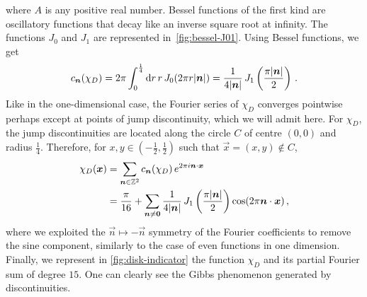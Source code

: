 \begin{example}
  where $A$ is any positive real number. Bessel functions of the first kind are
  oscillatory functions that decay like an inverse square root at infinity. The functions
  $J_0$ and $J_1$ are represented in~\cref{fig:bessel-J01}. Using Bessel functions, we get
  \begin{equation}
    c_{\bm{n}}(\chi_D)=2\pi\int_0^{\frac{1}{4}}\mathrm{d} r\,r\,J_0(2\pi r|\bm{n}|)
    =\frac{1}{4|\bm{n}|}\,J_1\left(\frac{\pi|\bm{n}|}{2}\right)\,.
  \end{equation}
  Like in the one-dimensional case, the Fourier series of $\chi_D$ converges pointwise
  perhaps except at points of jump discontinuity, which we will admit here. For $\chi_D$,
  the jump discontinuities are located along the circle $C$ of centre $(0,0)$ and radius
  $\frac14$. Therefore, for $x,y\in(-\frac12,\frac12)$ such that $\vec{x}=(x,y)\notin C$,
  \begin{align}
    \chi_D(\bm{x})&=\sum_{\bm{n}\in\mathbb{Z}^2}c_{\bm{n}}(\chi_D)\,
    e^{2\pi i\bm{n}\cdotp\bm{x}}\\
    &=\frac{\pi}{16}+\sum_{\bm{n}\neq\bm{0}}
    \frac{1}{4|\bm{n}|}\,J_1\left(\frac{\pi|\bm{n}|}{2}\right)
    \cos(2\pi\bm{n}\cdot\bm{x})\,,
  \end{align}
  where we exploited the $\vec{n}\mapsto-\vec{n}$ symmetry of the Fourier coefficients to
  remove the sine component, similarly to the case of even functions in one dimension.
  Finally, we represent in \cref{fig:disk-indicator} the function $\chi_D$ and its partial
  Fourier sum of degree $15$. One can clearly see the Gibbs phenomenon generated by
  discontinuities.
\end{example}
